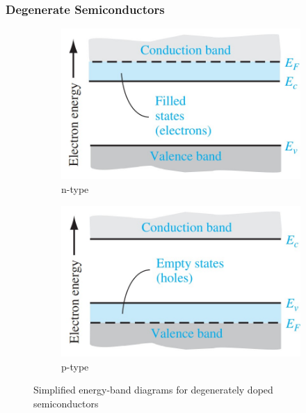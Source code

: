 \documentclass{beamer}
\begin{document}
    \begin{frame} \frametitle{Degenerate Semiconductors}
        \begin{figure}[H]
            \centering
            \begin{subfigure}[b]{0.45\linewidth}
                \centering
                \includegraphics[width=0.9\linewidth]{Degenerate-n.jpg}
                \caption{n-type}
                \label{subfig:Degenerate-n.jpg}
            \end{subfigure}
            \begin{subfigure}[b]{0.45\linewidth}
                \centering
                \includegraphics[width=0.9\linewidth]{Degenerate-p.jpg}
                \caption{p-type}
                \label{subfig:Degenerate-p.jpg}
            \end{subfigure}
            \caption{Simplified energy-band diagrams for degenerately doped semiconductors}
            \label{fig:degenerate}
        \end{figure}
        
    \end{frame}
\end{document}

